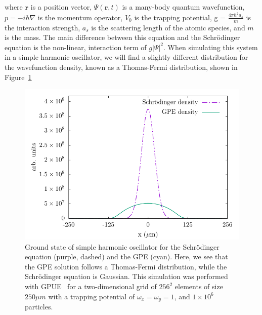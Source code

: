 \noindent where $\mathbf{r}$ is a position vector, $\Psi(\mathbf{r},t)$ is a many-body quantum wavefunction, $p = -i\hbar\nabla$ is the momentum operator, $V_0$ is the trapping potential, g = $\frac{4\pi\hbar^2 a_s}{m}$ is the interaction strength, $a_s$ is the scattering length of the atomic species, and $m$ is the mass.
The main difference between this equation and the Schr\"odinger equation is the non-linear, interaction term of $g|\Psi|^2$.
When simulating this system in a simple harmonic oscillator, we will find a slightly different distribution for the wavefunction density, known as a Thomas-Fermi distribution, shown in Figure~\ref{fig:TF}

\begin{figure}
\center \includegraphics[width = \textwidth]{data/qs/SHO/SHO.pdf}

\caption{Ground state of simple harmonic oscillator for the Schr\"odinger equation (purple, dashed) and the GPE (cyan).
Here, we see that the GPE solution follows a Thomas-Fermi distribution, while the Schr\"odinger equation is Gaussian.
This simulation was performed with GPUE~\cite{schloss2018} for a two-dimensional grid of $256^2$ elements of size $250 \mu m$ with a trapping potential of $\omega_x = \omega_y = 1$, and $1\times 10^6$ particles.}
\label{fig:TF}
\end{figure}


